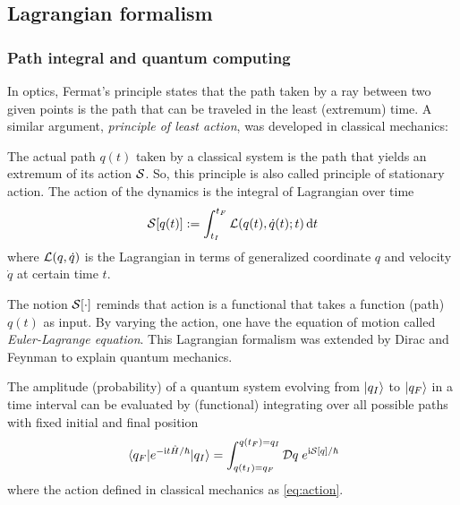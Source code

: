 \subsection{Lagrangian formalism}\label{sec:lagrangian}
\subsubsection{Path integral and quantum computing}
\cite{xuLagrangianFormalismQuantum2021}
In optics, Fermat's principle states that the path taken by a ray between two given points is the path that can be traveled in the least (extremum) time. 
A similar argument, \emph{principle of least action}, was developed in classical mechanics:
\begin{axiom}\label{thm:least_action}
    The actual path $q(t)$ taken by a classical system is the path that 
	yields an extremum of its action \(\mathcal{S}\).
	So, this principle is also called principle of stationary action.
	The action of the dynamics is the integral of Lagrangian over time
	\begin{equation}
		\mathcal{S}[q(t)]:=\int_{t_I}^{t_F}\mathcal{L}(q(t),\dot{q}(t);t)\dd{t}
		\label{eq:action}
	\end{equation}
	where $\mathcal{L}(q,\dot{q})$ is the Lagrangian in terms of generalized coordinate $q$ and velocity $\dot{q}$ at certain time $t$. 
\end{axiom}
The notion $\mathcal{S}[\cdot]$ reminds that action is a functional that takes a function (path) $q(t)$ as input.
By varying the action, one have the equation of motion 
called \emph{Euler-Lagrange equation}.
This Lagrangian formalism was extended by Dirac \cite{diracAnalogyClassicalQuantum1945} and Feynman \cite{feynmanQuantumMechanicsPath2010} to explain quantum mechanics. 
\begin{axiom}\label{thm:path_integral}
    The amplitude (probability) of a quantum system evolving from $\ket{q_I}$ to $\ket{q_F}$ in a time interval can be evaluated by (functional) integrating over all possible paths with fixed initial and final position 
    \begin{equation}
		\mel{q_F}{e^{-\textup{i}t\hat{H}/\hbar}}{q_I} =
        \int_{q(t_I)= q_F}^{q(t_F)=q_I} \mathcal{D} q \; e^{\textup{i} \mathcal{S}[q]/\hbar}
    \end{equation}
	where the action defined in classical mechanics as \cref{eq:action}.
\end{axiom}
